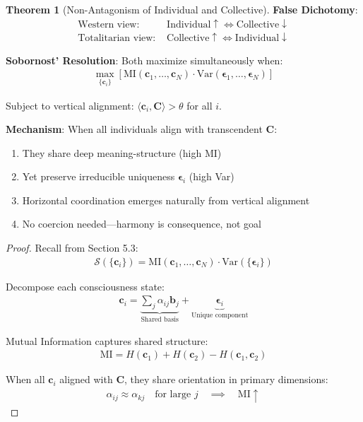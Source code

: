 \documentclass[11pt,a4paper]{article}
\theoremstyle{definition}
\newtheorem{theorem}{Theorem}[section]
\theoremstyle{remark}
\newcommand{\bb}{\mathbf{b}}
\newcommand{\cc}{\mathbf{c}}
\begin{document}
\begin{small}
\begin{enumerate}
\begin{theorem}[Non-Antagonism of Individual and Collective]
\textbf{False Dichotomy}:
\begin{align}
\text{Western view: } &\text{Individual} \uparrow \iff \text{Collective} \downarrow \\
\text{Totalitarian view: } &\text{Collective} \uparrow \iff \text{Individual} \downarrow
\end{align}

\textbf{Sobornost' Resolution}: Both maximize simultaneously when:
\begin{align}
\max_{\{\cc_i\}} \left[\text{MI}(\cc_1, \ldots, \cc_N) \cdot \text{Var}(\boldsymbol{\epsilon}_1, \ldots, \boldsymbol{\epsilon}_N)\right]
\end{align}

Subject to vertical alignment: \(\langle \cc_i, \mathbf{C} \rangle > \theta\) for all \(i\).

\textbf{Mechanism}: When all individuals align with transcendent \(\mathbf{C}\):
\begin{enumerate}
    \item They share deep meaning-structure (high MI)
    \item Yet preserve irreducible uniqueness \(\boldsymbol{\epsilon}_i\) (high Var)
    \item Horizontal coordination emerges naturally from vertical alignment
    \item No coercion needed—harmony is consequence, not goal
\end{enumerate}
\end{theorem}

\begin{proof}
Recall from Section 5.3:
\begin{align}
\mathcal{S}(\{\cc_i\}) = \text{MI}(\cc_1, \ldots, \cc_N) \cdot \text{Var}(\{\boldsymbol{\epsilon}_i\})
\end{align}

Decompose each consciousness state:
\begin{align}
\cc_i = \underbrace{\sum_j \alpha_{ij} \bb_j}_{\text{Shared basis}} + \underbrace{\boldsymbol{\epsilon}_i}_{\text{Unique component}}
\end{align}

Mutual Information captures shared structure:
\begin{align}
\text{MI} = H(\cc_1) + H(\cc_2) - H(\cc_1, \cc_2)
\end{align}

When all \(\cc_i\) aligned with \(\mathbf{C}\), they share orientation in primary dimensions:
\begin{align}
\alpha_{ij} \approx \alpha_{kj} \quad \text{for large } j \quad \implies \quad \text{MI} \uparrow
\end{align}


\end{proof}
\end{enumerate}
\end{small}
\end{document}
